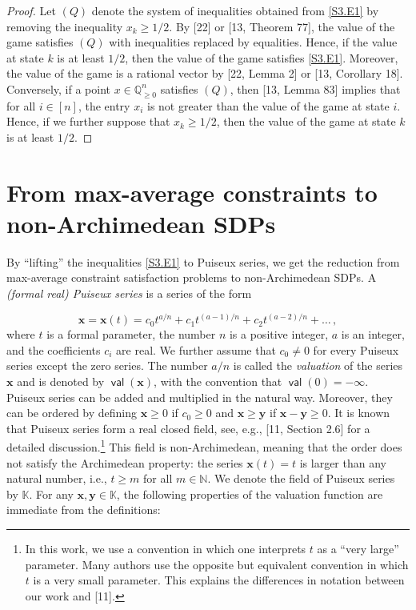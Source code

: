 \begin{proof}
Let $(Q)$ denote the system of inequalities obtained from \eqref{S3.E1} by removing the inequality $x_{k}\geq 1/2$. By [22] or [13, Theorem 77], the value of the game satisfies $(Q)$ with inequalities replaced by equalities. Hence, if the value at state $k$ is at least $1/2$, then the value of the game satisfies \eqref{S3.E1}. Moreover, the value of the game is a rational vector by [22, Lemma 2] or [13, Corollary 18]. Conversely, if a point $x\in\mathbb{Q}_{\geq 0}^{n}$ satisfies $(Q)$, then [13, Lemma 83] implies that for all $i\in[n]$, the entry $x_{i}$ is not greater than the value of the game at state $i$. Hence, if we further suppose that $x_{k}\geq 1/2$, then the value of the game at state $k$ is at least $1/2$. 

\end{proof}

\section*{From max-average constraints to non-Archimedean SDPs}

By “lifting” the inequalities \eqref{S3.E1} to Puiseux series, we get the reduction from max-average constraint satisfaction problems to non-Archimedean SDPs. A \emph{(formal real) Puiseux series} is a series of the form


\[
\bm{x}=\bm{x}(t)=c_{0}t^{a/n}+c_{1}t^{(a-1)/n}+c_{2}t^{(a-2)/n}+\dots\,,
\]
where $t$ is a formal parameter, the number $n$ is a positive integer, $a$ is an integer, and the coefficients $c_{i}$ are real. We further assume that $c_{0}\neq 0$ for every Puiseux series except the zero series. The number $a/n$ is called the \emph{valuation} of the series $\bm{x}$ and is denoted by $\operatorname*{\mathsf{val}}(\bm{x})$, with the convention that $\operatorname*{\mathsf{val}}(0)=-\infty$. Puiseux series can be added and multiplied in the natural way. Moreover, they can be ordered by defining $\bm{x}\geq 0$ if $c_{0}\geq 0$ and $\bm{x}\geq\bm{y}$ if $\bm{x}-\bm{y}\geq 0$. It is known that Puiseux series form a real closed field, see, e.g., [11, Section 2.6] for a detailed discussion.\footnote{In this work, we use a convention in which one interprets $t$ as a “very large” parameter. Many authors use the opposite but equivalent convention in which $t$ is a very small parameter. This explains the differences in notation between our work and [11].} This field is non-Archimedean, meaning that the order does not satisfy the Archimedean property: the series $\bm{x}(t)=t$ is larger than any natural number, i.e., $t\geq m$ for all $m\in\mathbb{N}$. We denote the field of Puiseux series by $\mathbb{K}$. For any $\bm{x},\bm{y}\in\mathbb{K}$, the following properties of the valuation function are immediate from the definitions:


